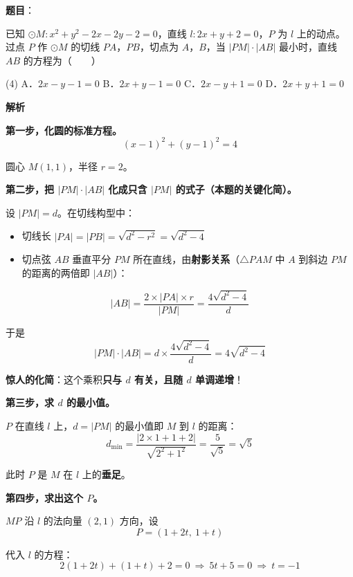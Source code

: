 \begin{answer}

\textbf{题目}：

已知 $\odot M:x^{2}+y^{2}-2x-2y-2=0$，直线 $l:2x+y+2=0$，$P$ 为 $l$ 上的动点。过点 $P$ 作 $\odot M$ 的切线 $PA$，$PB$，切点为 $A$，$B$，当 $|PM|\cdot|AB|$ 最小时，直线 $AB$ 的方程为\mbox{（　　）}

\begin{gkopts}(4)
\task A．$2x-y-1=0$
\task B．$2x+y-1=0$
\task C．$2x-y+1=0$
\task D．$2x+y+1=0$
\end{gkopts}

\textbf{解析}

\textbf{第一步，化圆的标准方程。}
\nopagebreak[4]
\[(x-1)^{2}+(y-1)^{2}=4\]

圆心 $M(1,1)$，半径 $r=2$。

\textbf{第二步，把 $|PM|\cdot|AB|$ 化成只含 $|PM|$ 的式子（本题的关键化简）。}

设 $|PM|=d$。在切线构型中：
\begin{itemize}
\item 切线长 $|PA|=|PB|=\sqrt{d^{2}-r^{2}}=\sqrt{d^{2}-4}$
\item 切点弦 $AB$ 垂直平分 $PM$ 所在直线，由\textbf{射影关系}（$\triangle PAM$ 中 $A$ 到斜边 $PM$ 的距离的两倍即 $|AB|$）：
\end{itemize}
\nopagebreak[4]
\[|AB|=\frac{2\times|PA|\times r}{|PM|}=\frac{4\sqrt{d^{2}-4}}d\]

于是
\nopagebreak[4]
\[|PM|\cdot|AB|=d\times\frac{4\sqrt{d^{2}-4}}d=4\sqrt{d^{2}-4}\]

\textbf{惊人的化简}：这个乘积\textbf{只与 $d$ 有关，且随 $d$ 单调递增}！

\textbf{第三步，求 $d$ 的最小值。}

$P$ 在直线 $l$ 上，$d=|PM|$ 的最小值即 $M$ 到 $l$ 的距离：
\nopagebreak[4]
\[d_{\min}=\frac{|2\times1+1+2|}{\sqrt{2^{2}+1^{2}}}=\frac5{\sqrt5}=\sqrt5\]

此时 $P$ 是 $M$ 在 $l$ 上的\textbf{垂足}。

\textbf{第四步，求出这个 $P$。}

$MP$ 沿 $l$ 的法向量 $(2,1)$ 方向，设
\nopagebreak[4]
\[P=(1+2t,\ 1+t)\]

代入 $l$ 的方程：
\nopagebreak[4]
\[2(1+2t)+(1+t)+2=0\ \Longrightarrow\ 5t+5=0\ \Longrightarrow\ t=-1\]


\end{answer}
